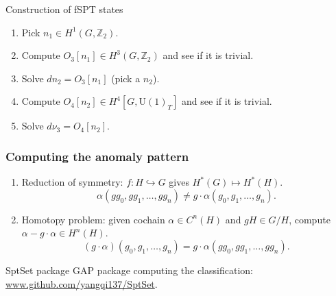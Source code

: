 \documentclass[xcolor=table, 11pt, aspectratio=169]{beamer}
\begin{document}
    \begin{frame}{Construction of fSPT states}
      \begin{enumerate}
      \item Pick $n_1\in H^1(G, \mathbb Z_2)$.
      \item Compute $O_3[n_1]\in H^3(G, \mathbb Z_2)$ and see if it is trivial.
      \item Solve $dn_2 = O_3[n_1]$ (pick a $n_2$).
      \item Compute $O_4[n_2]\in H^4[G, \mathrm U(1)_T]$ and see if it is trivial.
      \item Solve $d\nu_3 = O_4[n_2]$.
      \end{enumerate}
    \end{frame}

    \begin{frame}
      \frametitle{Computing the anomaly pattern}
      \begin{enumerate}
        \item Reduction of symmetry: $f: H\hookrightarrow G$ gives $H^*(G)\mapsto H^*(H)$.
        \[\alpha(gg_0, gg_1,\ldots, gg_n)\neq
        g\cdot\alpha(g_0, g_1, \ldots, g_n).\]
        \item Homotopy problem: given cochain $\alpha\in C^n(H)$ and $gH\in G/H$, compute $\alpha-g\cdot\alpha\in H^n(H)$.
        \[(g\cdot\alpha)(g_0, g_1, \ldots, g_n)
        =g\cdot\alpha(gg_0, gg_1,\ldots, gg_n).\]
      \end{enumerate}
      \begin{block}{SptSet package}
        GAP package computing the classification: \url{www.github.com/yangqi137/SptSet}.
      \end{block}

    \end{frame}
    
\end{document}
